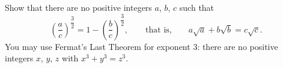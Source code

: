 Show that there are no positive integers $a$, $b$, $c$ such that
\[\left(\dfrac {a}{c}\right)^{\dfrac{3}{2}}=1-\left(\dfrac {b}{c}\right)^{\dfrac{3}{2}},\qquad\text{that is,}\qquad a\sqrt a+b\sqrt b=c\sqrt c .\]
You may use Fermat's Last Theorem for exponent $3$: there are no positive integers $x$, $y$, $z$ with $x^3+y^3=z^3$.
